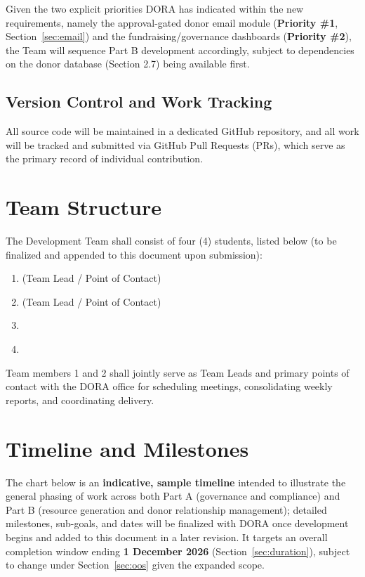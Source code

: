 \documentclass[11pt]{article}
\begin{document}
Given the two explicit priorities DORA has indicated within the new requirements, namely the approval-gated donor email module (\textbf{Priority \#1}, Section~\ref{sec:email}) and the fundraising/governance dashboards (\textbf{Priority \#2}), the Team will sequence Part B development accordingly, subject to dependencies on the donor database (Section 2.7) being available first.

\subsection{Version Control and Work Tracking}
All source code will be maintained in a dedicated GitHub repository, and all work will be tracked and submitted via GitHub Pull Requests (PRs), which serve as the primary record of individual contribution.

\section{Team Structure}
The Development Team shall consist of four (4) students, listed below (to be finalized and appended to this document upon submission):

\begin{enumerate}[leftmargin=1.8em, itemsep=4pt]
\item \underline{\hspace{7cm}} (Team Lead / Point of Contact)
\item \underline{\hspace{7cm}} (Team Lead / Point of Contact)
\item \underline{\hspace{7cm}}
\item \underline{\hspace{7cm}}
\end{enumerate}

Team members 1 and 2 shall jointly serve as Team Leads and primary points of contact with the DORA office for scheduling meetings, consolidating weekly reports, and coordinating delivery.

\section{Timeline and Milestones}
\label{sec:timeline}
The chart below is an \textbf{indicative, sample timeline} intended to illustrate the general phasing of work across both Part A (governance and compliance) and Part B (resource generation and donor relationship management); detailed milestones, sub-goals, and dates will be finalized with DORA once development begins and added to this document in a later revision. It targets an overall completion window ending \textbf{1 December 2026} (Section~\ref{sec:duration}), subject to change under Section~\ref{sec:oos} given the expanded scope.
\end{document}
